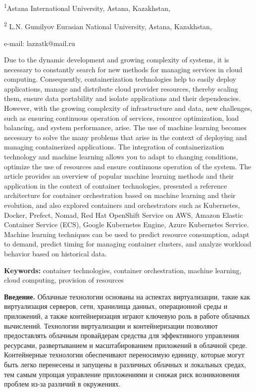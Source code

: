 \textsuperscript{1}Astana International University, Astana, Kazakhstan,

\textsuperscript{2} L.N. Gumilyov Eurasian National University, Astana,
Kazakhstan,

e-mail: lazzatk@mail.ru

Due to the dynamic development and growing complexity of systems, it is
necessary to constantly search for new methods for managing services in
cloud computing. Consequently, containerization technologies help to
easily deploy applications, manage and distribute cloud provider
resources, thereby scaling them, ensure data portability and isolate
applications and their dependencies. However, with the growing
complexity of infrastructure and data, new challenges, such as ensuring
continuous operation of services, resource optimization, load balancing,
and system performance, arise. The use of machine learning becomes
necessary to solve the many problems that arise in the context of
deploying and managing containerized applications. The integration of
containerization technology and machine learning allows you to adapt to
changing conditions, optimize the use of resources and ensure continuous
operation of the system. The article provides an overview of popular
machine learning methods and their application in the context of
container technologies, presented a reference architecture for container
orchestration based on machine learning and their evolution, and also
explored containers and orchestrators such as Kubernetes, Docker,
Prefect, Nomad, Red Hat OpenShift Service on AWS, Amazon Elastic
Container Service (ECS), Google Kubernetes Engine, Azure Kubernetes
Service. Machine learning techniques can be used to predict resource
consumption, adapt to demand, predict timing for managing container
clusters, and analyze workload behavior based on historical data.

\textbf{Keywords:} container technologies, container orchestration,
machine learning, cloud computing, provision of resources

\textbf{Введение.} Облачные технологии основаны на аспектах
виртуализации, такие как виртуализация серверов, сети, хранилища данных,
операционной среды и приложений, а также контейнеризация играют ключевую
роль в работе облачных вычислений. Технологии виртуализации и
контейнеризации позволяют предоставлять облачным провайдерам средства
для эффективного управления ресурсами, развертыванием и масштабированием
приложений в облачной среде. Контейнерные технологии обеспечивают
переносимую единицу, которые могут быть легко перенесены и запущены в
различных облачных и локальных средах, тем самым упрощая управление
приложениями и снижая риск возникновения проблем из-за различий в
окружениях.

